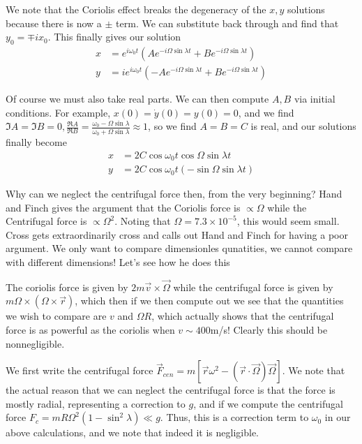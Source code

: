 \documentclass[10pt]{report}
\newcommand{\scinot}[2]{#1\times 10^{#2}}
\begin{document}
We note that the Coriolis effect breaks the degeneracy of the $x,y$ solutions because there is now a $\pm$ term. We can substitute back through and find that $y_0 = \mp ix_0$. This finally gives our solution
\begin{align*}
    x &= e^{i\omega_0 t}\left( Ae^{-i\Omega\sin\lambda t} + Be^{-i\Omega\sin\lambda t} \right)\\
    y &= ie^{i\omega_0 t}\left( -Ae^{-i\Omega\sin\lambda t} + Be^{-i\Omega\sin\lambda t} \right)
\end{align*}

Of course we must also take real parts. We can then compute $A,B$ via initial conditions. For example, $x(0) = \dot{y}(0) = y(0) = 0$, and we find $\Im A = \Im B = 0, \frac{\Re A}{\Re B} = \frac{\omega_0 - \Omega \sin \lambda}{\omega_0 + \Omega\sin\lambda} \approx 1$, so we find $A=B=C$ is real, and our solutions finally become
\begin{align*}
    x &= 2C\cos \omega_0 t \cos \Omega \sin \lambda t\\
    y &= 2C \cos \omega_0 t (-\sin \Omega \sin \lambda t)
\end{align*}

Why can we neglect the centrifugal force then, from the very beginning? Hand and Finch gives the argument that the Coriolis force is $\propto \Omega$ while the Centrifugal force is $\propto\Omega^2$. Noting that $\Omega = \scinot{7.3}{-5}$, this would seem small. Cross gets extraordinarily cross and calls out Hand and Finch for having a poor argument. We only want to compare dimensionles qunatities, we cannot compare with different dimensions! Let's see how he does this

The coriolis force is given by $2m\vec{v}\times \vec{\Omega}$ while the centrifugal force is given by $m\Omega \times \left( \Omega \times \vec{r} \right)$, which then if we then compute out we see that the quantities we wish to compare are $v$ and $\Omega R$, which actually shows that the centrifugal force is as powerful as the coriolis when $v \sim 400$m/s! Clearly this should be nonnegligible.

We first write the centrifugal force $\vec{F}_{cen} = m\left[ \vec{r}\omega^2 - \left( \vec{r}\cdot \vec{\Omega} \right)\vec{\Omega} \right]$. We note that the actual reason that we can neglect the centrifugal force is that the force is mostly radial, representing a correction to $g$, and if we compute the centrifugal force $F_{c} = mR\Omega^2 \left( 1-\sin^2 \lambda \right) \ll g$. Thus, this is a correction term to $\omega_0$ in our above calculations, and we note that indeed it is negligible. 
\end{document}
